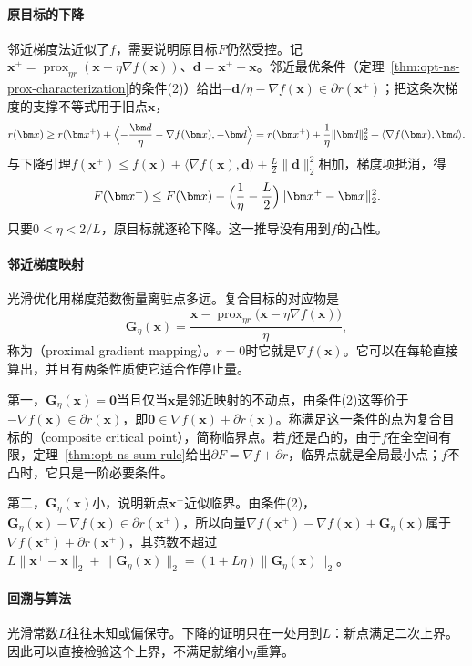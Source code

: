 \paragraph{原目标的下降}
邻近梯度法近似了$f$，需要说明原目标$F$仍然受控。记$\bm x^+=\operatorname{prox}_{\eta r}(\bm x-\eta\nabla f(\bm x))$、$\bm d=\bm x^+-\bm x$。邻近最优条件（定理~\ref{thm:opt-ns-prox-characterization}的条件(2)）给出$-\bm d/\eta-\nabla f(\bm x)\in\partial r(\bm x^+)$；把这条次梯度的支撑不等式用于旧点$\bm x$，
\[
 r(\bm x)\geq r(\bm x^+)+\Bigl\langle-\frac{\bm d}\eta-\nabla f(\bm x),-\bm d\Bigr\rangle=r(\bm x^+)+\frac1\eta\lVert\bm d\rVert_2^2+\langle\nabla f(\bm x),\bm d\rangle .
\]
与下降引理$f(\bm x^+)\leq f(\bm x)+\langle\nabla f(\bm x),\bm d\rangle+\frac L2\lVert\bm d\rVert_2^2$相加，梯度项抵消，得
\begin{equation}
 F(\bm x^+)\leq F(\bm x)-\Bigl(\frac1\eta-\frac L2\Bigr)\lVert\bm x^+-\bm x\rVert_2^2 .
 \label{eq:opt-ns-proximal-gradient-descent}
\end{equation}
只要$0<\eta<2/L$，原目标就逐轮下降。这一推导没有用到$f$的凸性。

\paragraph{邻近梯度映射}
光滑优化用梯度范数衡量离驻点多远。复合目标的对应物是
\[
 \bm G_\eta(\bm x)=\frac{\bm x-\operatorname{prox}_{\eta r}\bigl(\bm x-\eta\nabla f(\bm x)\bigr)}\eta ,
\]
称为（proximal gradient mapping）。$r=0$时它就是$\nabla f(\bm x)$。它可以在每轮直接算出，并且有两条性质使它适合作停止量。

第一，$\bm G_\eta(\bm x)=\bm 0$当且仅当$\bm x$是邻近映射的不动点，由条件(2)这等价于$-\nabla f(\bm x)\in\partial r(\bm x)$，即$\bm 0\in\nabla f(\bm x)+\partial r(\bm x)$。称满足这一条件的点为复合目标的（composite critical point），简称临界点。若$f$还是凸的，由于$f$在全空间有限，定理~\ref{thm:opt-ns-sum-rule}给出$\partial F=\nabla f+\partial r$，临界点就是全局最小点；$f$不凸时，它只是一阶必要条件。

第二，$\bm G_\eta(\bm x)$小，说明新点$\bm x^+$近似临界。由条件(2)，$\bm G_\eta(\bm x)-\nabla f(\bm x)\in\partial r(\bm x^+)$，所以向量$\nabla f(\bm x^+)-\nabla f(\bm x)+\bm G_\eta(\bm x)$属于$\nabla f(\bm x^+)+\partial r(\bm x^+)$，其范数不超过$L\lVert\bm x^+-\bm x\rVert_2+\lVert\bm G_\eta(\bm x)\rVert_2=(1+L\eta)\lVert\bm G_\eta(\bm x)\rVert_2$。

\paragraph{回溯与算法}
光滑常数$L$往往未知或偏保守。下降的证明只在一处用到$L$：新点满足二次上界。因此可以直接检验这个上界，不满足就缩小$\eta$重算。


